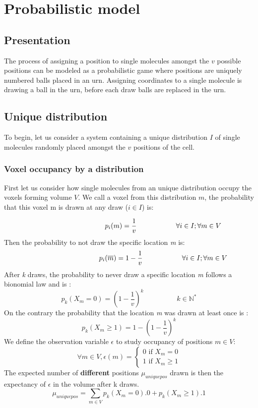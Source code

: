 \documentclass{article}
\begin{document}
\newpage
\section{Probabilistic model}

\subsection{Presentation}
The process of assigning a position to single molecules amongst the $v$ possible positions can be modeled as a probabilistic game where
positions are uniquely numbered balls placed in an urn. Assigning coordinates to a single molecule is drawing a ball in the urn,
before each draw balls are replaced in the urn.
\subsection{Unique distribution}
To begin, let us consider a system containing a unique distribution $I$ of single molecules randomly placed amongst the $v$ positions of the cell.

\subsubsection{Voxel occupancy by a distribution}
First let us consider how single molecules from an unique distribution occupy the voxels forming volume $V$. We call a voxel from this distribution $m$, the 
probability that this voxel m is drawn at any draw ($i \in I$) is:

\[
    \hspace{3.5cm} p_i(m) = \frac{1}{v} \hspace{2cm} \forall  i \in I; \forall m \in V
\]
Then the probability to not draw the specific location \textit{m} is:
\[
    \hspace{3.5cm} p_i(\overline{m}) = 1-\frac{1}{v} \hspace{2cm} \forall  i \in I; \forall m \in V
\]
After \textit{k} draws, the probability to never draw a specific location \textit{m} follows a bionomial law and is :
\[
p_k(X_m = 0) = (1 - \frac{1}{v})^k \hspace{2cm} k \in \mathbb{N^*}
\]
On the contrary the probability that the location \textit{m} was drawn at least once is :
\begin{equation}
p_k(X_m \geq 1) = 1-(1 - \frac{1}{v})^k
\end{equation}
We define the observation variable $\epsilon$ to study occupancy of positions $m \in V$:
\[
\forall m \in V, \epsilon (m) = \begin{cases}
    0 \text{ if } X_m = 0 \\
    1 \text{ if } X_m \geq 1
\end{cases}
\]
The expected number of \textbf{different} positions $ \mu_{uniquepos} $ drawn is then the expectancy of $ \epsilon $ in the volume after k draws.
\[
    \mu_{uniquepos} = \sum_{m \in V}p_k(X_m = 0).0 + p_k(X_m \geq 1).1
\]
\end{document}
